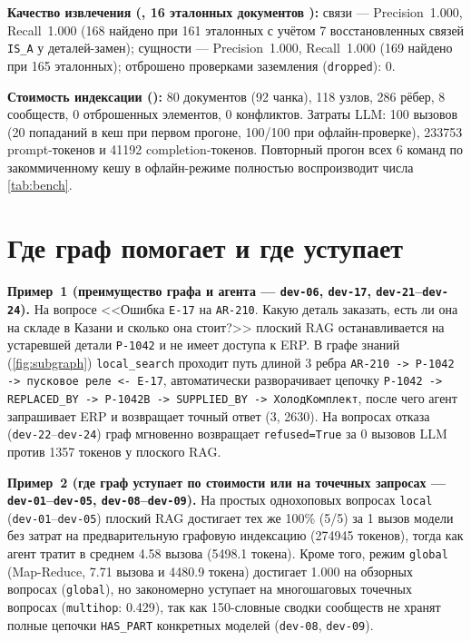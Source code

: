 \documentclass[a4paper,11pt]{article}
\begin{document}
\textbf{Качество извлечения (, \num{16} эталонных документов ):} связи --- Precision~\num{1.000}, Recall~\num{1.000} (\num{168} найдено при \num{161} эталонных с учётом \num{7} восстановленных связей \texttt{IS\_A} у деталей-замен); сущности --- Precision~\num{1.000}, Recall~\num{1.000} (\num{169} найдено при \num{165} эталонных); отброшено проверками заземления (\texttt{dropped}): \num{0}.

\textbf{Стоимость индексации ():} \num{80} документов (\num{92} чанка), \num{118} узлов, \num{286} рёбер, \num{8} сообществ, \num{0} отброшенных элементов, \num{0} конфликтов. Затраты LLM: \num{100} вызовов (\num{20} попаданий в кеш при первом прогоне, \num{100}/\num{100} при офлайн-проверке), \num{233753} prompt-токенов и \num{41192} completion-токенов. Повторный прогон всех \num{6} команд по закоммиченному кешу в офлайн-режиме полностью воспроизводит числа \cref{tab:bench}.

\section{Где граф помогает и где уступает}\label{sec:compare}

\textbf{Пример~1 (преимущество графа и агента --- \texttt{dev-06}, \texttt{dev-17}, \texttt{dev-21}--\texttt{dev-24}).} На вопросе <<Ошибка \texttt{E-17} на \texttt{AR-210}. Какую деталь заказать, есть ли она на складе в Казани и сколько она стоит?>> плоский RAG останавливается на устаревшей детали \texttt{P-1042} и не имеет доступа к ERP. В графе знаний (\cref{fig:subgraph}) \texttt{local\_search} проходит путь длиной \num{3} ребра \texttt{AR-210 -> P-1042 -> пусковое реле <- E-17}, автоматически разворачивает цепочку \texttt{P-1042 -> REPLACED\_BY -> P-1042B -> SUPPLIED\_BY -> ХолодКомплект}, после чего агент запрашивает ERP и возвращает точный ответ (\SI{3}{}, \SI{2630}{}). На вопросах отказа (\texttt{dev-22}--\texttt{dev-24}) граф мгновенно возвращает \texttt{refused=True} за \num{0} вызовов LLM против \num{1357} токенов у плоского RAG.

\textbf{Пример~2 (где граф уступает по стоимости или на точечных запросах --- \texttt{dev-01}--\texttt{dev-05}, \texttt{dev-08}--\texttt{dev-09}).} На простых однохоповых вопросах \texttt{local} (\texttt{dev-01}--\texttt{dev-05}) плоский RAG достигает тех же \num{100}\% (\num{5}/\num{5}) за \num{1} вызов модели без затрат на предварительную графовую индексацию (\num{274945} токенов), тогда как агент тратит в среднем \num{4.58} вызова (\num{5498.1} токена). Кроме того, режим \texttt{global} (Map-Reduce, \num{7.71} вызова и \num{4480.9} токена) достигает \num{1.000} на обзорных вопросах (\texttt{global}), но закономерно уступает на многошаговых точечных вопросах (\texttt{multihop}: \num{0.429}), так как \num{150}-словные сводки сообществ не хранят полные цепочки \texttt{HAS\_PART} конкретных моделей (\texttt{dev-08}, \texttt{dev-09}).
\end{document}

